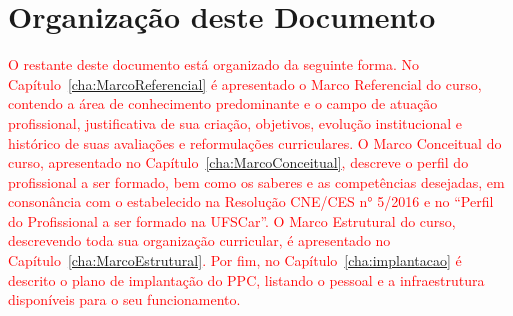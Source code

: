 \section{Organização deste Documento}

\textcolor{red}{O restante deste documento está organizado da seguinte forma. No Capítulo~\ref{cha:MarcoReferencial} é apresentado o Marco Referencial do curso, contendo a área de conhecimento predominante e o campo de atuação profissional, justificativa de sua criação, objetivos, evolução institucional e histórico de suas avaliações e reformulações curriculares. O Marco Conceitual do curso, apresentado no Capítulo~\ref{cha:MarcoConceitual}, descreve o perfil do profissional a ser formado, bem como os saberes e as competências desejadas, em consonância com o estabelecido na Resolução CNE/CES n° 5/2016 e no ``Perfil do Profissional a ser formado na UFSCar''. O Marco Estrutural do curso, descrevendo toda sua organização curricular, é apresentado no Capítulo~\ref{cha:MarcoEstrutural}. Por fim, no Capítulo~\ref{cha:implantacao} é descrito o plano de implantação do PPC, listando o pessoal e a infraestrutura disponíveis para o seu funcionamento.}
